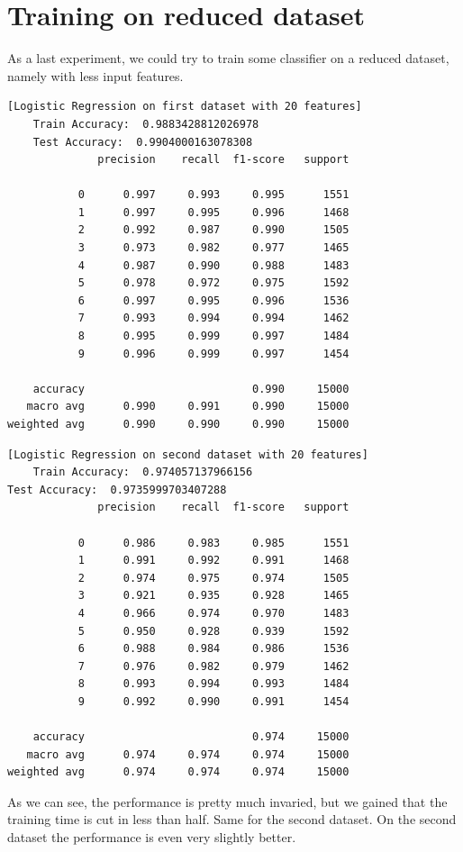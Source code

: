 \documentclass[12pt,a4paper,oneside]{article}
\begin{document}
\section{Training on reduced dataset}

As a last experiment, we could try to train some classifier on a reduced
dataset, namely with less input features.

\begin{verbatim}[Logistic Regression on first dataset with 20 features]
    Train Accuracy:  0.9883428812026978
    Test Accuracy:  0.9904000163078308
              precision    recall  f1-score   support

           0      0.997     0.993     0.995      1551
           1      0.997     0.995     0.996      1468
           2      0.992     0.987     0.990      1505
           3      0.973     0.982     0.977      1465
           4      0.987     0.990     0.988      1483
           5      0.978     0.972     0.975      1592
           6      0.997     0.995     0.996      1536
           7      0.993     0.994     0.994      1462
           8      0.995     0.999     0.997      1484
           9      0.996     0.999     0.997      1454

    accuracy                          0.990     15000
   macro avg      0.990     0.991     0.990     15000
weighted avg      0.990     0.990     0.990     15000
\end{verbatim}

\begin{verbatim}[Logistic Regression on second dataset with 20 features]
    Train Accuracy:  0.974057137966156
Test Accuracy:  0.9735999703407288
              precision    recall  f1-score   support

           0      0.986     0.983     0.985      1551
           1      0.991     0.992     0.991      1468
           2      0.974     0.975     0.974      1505
           3      0.921     0.935     0.928      1465
           4      0.966     0.974     0.970      1483
           5      0.950     0.928     0.939      1592
           6      0.988     0.984     0.986      1536
           7      0.976     0.982     0.979      1462
           8      0.993     0.994     0.993      1484
           9      0.992     0.990     0.991      1454

    accuracy                          0.974     15000
   macro avg      0.974     0.974     0.974     15000
weighted avg      0.974     0.974     0.974     15000
\end{verbatim}

As we can see, the performance is pretty much invaried, but we gained that the
training time is cut in less than half. Same for the second dataset. On the
second dataset the performance is even very slightly better.



\nocite{*}  %
\end{document}

